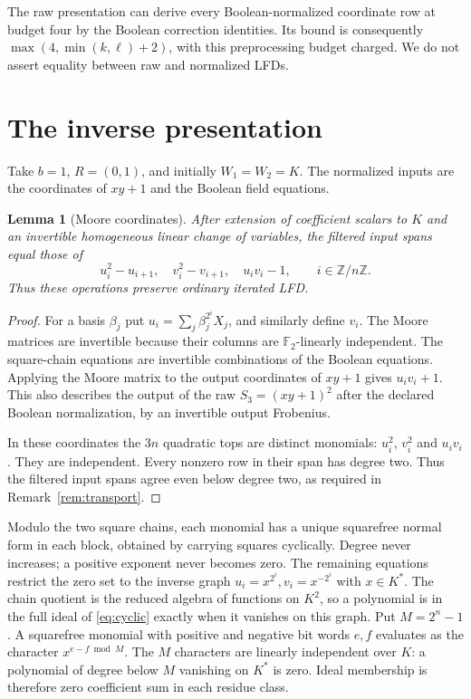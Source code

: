 \documentclass[11pt]{article}
\newtheorem{lemma}[theorem]{Lemma}
\theoremstyle{remark}\newtheorem{remark}[theorem]{Remark}
\newcommand{\F}{\mathbb F}
\begin{document}
The raw presentation can derive every Boolean-normalized coordinate row at
budget four by the Boolean correction identities. Its bound is consequently
$\max(4,\min(k,\ell)+2)$, with this preprocessing budget charged. We do
not assert equality between raw and normalized LFDs.

\section{The inverse presentation}
Take $b=1$, $R=(0,1)$, and initially $W_1=W_2=K$. The normalized inputs
are the coordinates of $xy+1$ and the Boolean field equations.

\begin{lemma}[Moore coordinates]\label{lem:moore}
After extension of coefficient scalars to $K$ and an invertible homogeneous
linear change of variables, the filtered input spans equal those of
\begin{equation}\label{eq:cyclic}
 u_i^2-u_{i+1},\quad v_i^2-v_{i+1},\quad u_iv_i-1,
                       \qquad i\in\mathbb Z/n\mathbb Z.
\end{equation}
Thus these operations preserve ordinary iterated LFD.
\end{lemma}
\begin{proof}
For a basis $\beta_j$ put
$u_i=\sum_j\beta_j^{2^i}X_j$, and similarly define $v_i$.
The Moore matrices are invertible because their columns are $\F_2$-linearly
independent. The square-chain equations are invertible combinations of
the Boolean equations. Applying the Moore matrix to the output coordinates
of $xy+1$ gives $u_iv_i+1$. This also describes the output of the raw
$S_3=(xy+1)^2$ after the declared Boolean normalization, by an invertible
output Frobenius.

In these coordinates the $3n$ quadratic tops are distinct monomials:
$u_i^2$, $v_i^2$ and $u_iv_i$. They are independent. Every nonzero row in
their span has degree two. Thus the filtered input spans agree even below
degree two, as required in Remark~\ref{rem:transport}.
\end{proof}

Modulo the two square chains, each monomial has a unique squarefree normal
form in each block, obtained by carrying squares cyclically. Degree never
increases; a positive exponent never becomes zero. The remaining equations
restrict the zero set to the inverse graph
$u_i=x^{2^i},v_i=x^{-2^i}$ with $x\in K^*$.
The chain quotient is the reduced algebra of functions on $K^2$, so a
polynomial is in the full ideal of \eqref{eq:cyclic} exactly when it vanishes
on this graph. Put $M=2^n-1$. A squarefree monomial with positive and
negative bit words $e,f$ evaluates as the character $x^{e-f\bmod M}$.
The $M$ characters are linearly independent over $K$: a polynomial of
degree below $M$ vanishing on $K^*$ is zero. Ideal membership is therefore
zero coefficient sum in each residue class.
\end{document}

